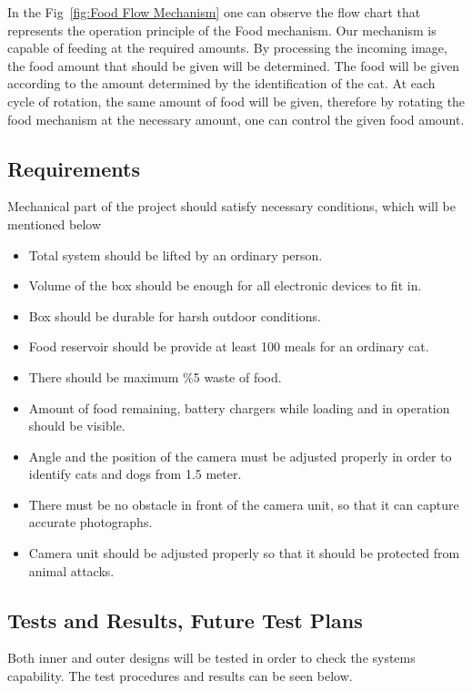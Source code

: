 In the Fig~\ref{fig:Food Flow Mechanism}  one can observe the flow chart that represents the operation principle of the Food mechanism. Our mechanism is capable of feeding at the required amounts. By processing the incoming image, the food amount that should be given will be determined. The food will be given according to the amount determined by the identification of the cat. At each cycle of rotation, the same amount of food will be given, therefore by rotating the food mechanism at the necessary amount, one can control the given food amount.  

\subsection{Requirements}

Mechanical part of the project should satisfy necessary conditions, which will be mentioned below

\begin{itemize}
    \item Total system should be lifted by an ordinary person. 
    \item Volume of the box should be enough for all electronic devices to fit in.
    \item Box should be durable for harsh outdoor conditions.
    \item Food reservoir should be provide at least 100 meals for an ordinary cat.
    \item There should be maximum \%5 waste of food. 
    \item Amount of food remaining, battery chargers while loading and in operation should be visible.
    \item Angle and the position of the camera must be adjusted properly in order to identify cats and dogs from 1.5 meter.
    \item There must be no obstacle in front of the camera unit, so that it can capture accurate photographs.
    \item Camera unit should be adjusted properly so that it should be protected from animal attacks.
\end{itemize}

\subsection{Tests and Results, Future Test Plans}
Both inner and outer designs will be tested in order to check the systems capability. The test procedures and results can be seen below.

